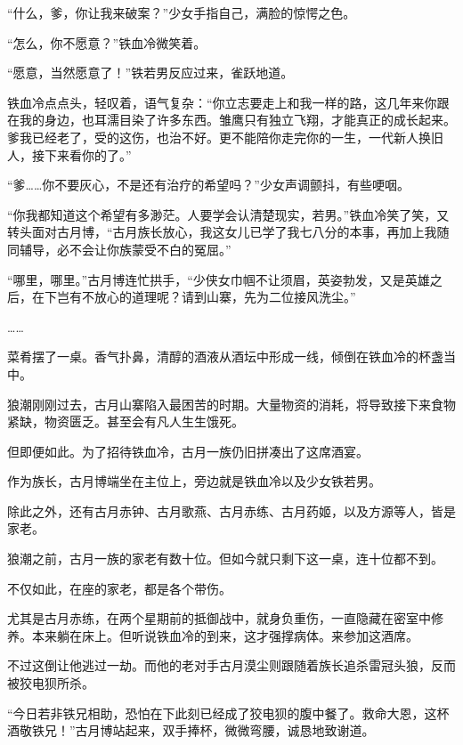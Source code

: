 
\begin{this_body}

“什么，爹，你让我来破案？”少女手指自己，满脸的惊愕之色。

“怎么，你不愿意？”铁血冷微笑着。

“愿意，当然愿意了！”铁若男反应过来，雀跃地道。

铁血冷点点头，轻叹着，语气复杂：“你立志要走上和我一样的路，这几年来你跟在我的身边，也耳濡目染了许多东西。雏鹰只有独立飞翔，才能真正的成长起来。爹我已经老了，受的这伤，也治不好。更不能陪你走完你的一生，一代新人换旧人，接下来看你的了。”

“爹……你不要灰心，不是还有治疗的希望吗？”少女声调颤抖，有些哽咽。

“你我都知道这个希望有多渺茫。人要学会认清楚现实，若男。”铁血冷笑了笑，又转头面对古月博，“古月族长放心，我这女儿已学了我七八分的本事，再加上我随同辅导，必不会让你族蒙受不白的冤屈。”

“哪里，哪里。”古月博连忙拱手，“少侠女巾帼不让须眉，英姿勃发，又是英雄之后，在下岂有不放心的道理呢？请到山寨，先为二位接风洗尘。”

……

菜肴摆了一桌。香气扑鼻，清醇的酒液从酒坛中形成一线，倾倒在铁血冷的杯盏当中。

狼潮刚刚过去，古月山寨陷入最困苦的时期。大量物资的消耗，将导致接下来食物紧缺，物资匮乏。甚至会有凡人生生饿死。

但即便如此。为了招待铁血冷，古月一族仍旧拼凑出了这席酒宴。

作为族长，古月博端坐在主位上，旁边就是铁血冷以及少女铁若男。

除此之外，还有古月赤钟、古月歌燕、古月赤练、古月药姬，以及方源等人，皆是家老。

狼潮之前，古月一族的家老有数十位。但如今就只剩下这一桌，连十位都不到。

不仅如此，在座的家老，都是各个带伤。

尤其是古月赤练，在两个星期前的抵御战中，就身负重伤，一直隐藏在密室中修养。本来躺在床上。但听说铁血冷的到来，这才强撑病体。来参加这酒席。

不过这倒让他逃过一劫。而他的老对手古月漠尘则跟随着族长追杀雷冠头狼，反而被狡电狈所杀。

“今日若非铁兄相助，恐怕在下此刻已经成了狡电狈的腹中餐了。救命大恩，这杯酒敬铁兄！”古月博站起来，双手捧杯，微微弯腰，诚恳地致谢道。


\end{this_body}
